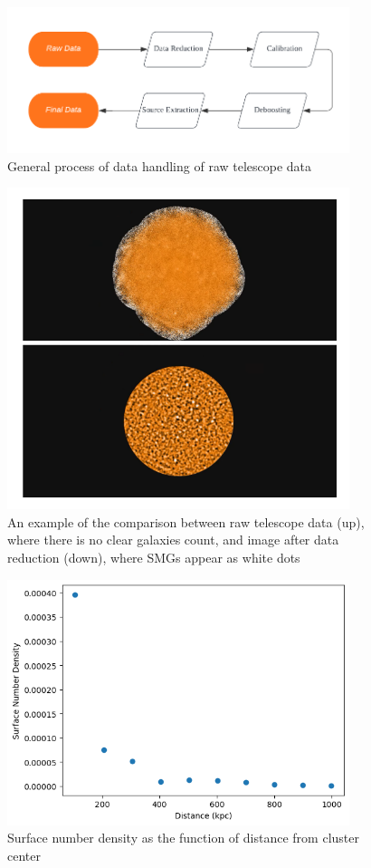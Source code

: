 \documentclass{article}
\begin{document}
\begin{figure}
    \centering
    \includegraphics[width=100mm]{Flowchart.png}
    \caption{General process of data handling of raw telescope data}
    \label{fig:flowchart1}
\end{figure}

\begin{figure}
    \centering
    \includegraphics[width=100mm]{reducevsunreduce.png}
    \caption{An example of the comparison between raw telescope data (up), where there is no clear galaxies count, and image after data reduction (down), where SMGs appear as white dots}
    \label{fig:reducevsunreduce}
\end{figure}

\begin{figure}
    \centering
    \includegraphics[width=100mm]{SNDensity.png}
    \caption{Surface number density as the function of distance from cluster center}
    \label{fig:sndensity}
\end{figure}
\end{document}
